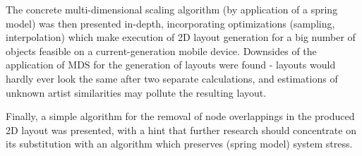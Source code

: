 The concrete multi-dimensional scaling algorithm (by application of a spring model) was then presented in-depth, incorporating optimizations (sampling, interpolation) which make execution of 2D layout generation for a big number of objects feasible on a current-generation mobile device. Downsides of the application of MDS for the generation of layouts were found - layouts would hardly ever look the same after two separate calculations, and estimations of unknown artist similarities may pollute the resulting layout. 

Finally, a simple algorithm for the removal of node overlappings in the produced 2D layout was presented, with a hint that further research should concentrate on its substitution with an algorithm which preserves (spring model) system stress.